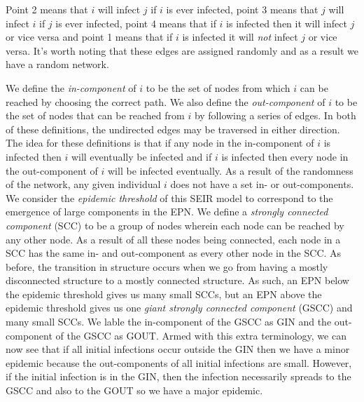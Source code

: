Point 2 means that $i$ will infect $j$ if $i$ is ever infected, point 3 means that $j$ will infect $i$ if $j$ is ever infected, point 4 means that if $i$ is infected then it will infect $j$ or vice
versa and point 1 means that if $i$ is infected it will \textit{not} infect $j$ or vice versa. It's worth noting that these edges are assigned randomly and as a result we have a
random network.

We define the \textit{in-component} of $i$ to be the set of nodes from which $i$ can be reached by choosing the correct path. We also define the \textit{out-component} of $i$ to be the set of nodes that can be reached from $i$
by following a series of edges. In both of these definitions, the undirected edges may be traversed in either direction. The idea for these definitions is that if any node in the
in-component of $i$ is infected then $i$ will eventually be infected and if $i$ is infected then every node in the out-component of $i$ will be infected eventually. As a result of
the randomness of the network, any given individual $i$ does not have a set in- or out-components. We consider the \textit{epidemic threshold} of this SEIR model to correspond to
the emergence of large components in the EPN. We define a \textit{strongly connected component} (SCC) to be a group of nodes wherein each node can be reached by any other node. As a
result of all these nodes being connected, each node in a SCC has the same in- and out-component as every other node in the SCC. As before, the transition in structure occurs when
we go from having a mostly disconnected structure to a mostly connected structure. As such, an EPN below the epidemic threshold gives us many small SCCs, but an EPN
above the epidemic threshold gives us one \textit{giant strongly connected component} (GSCC) and many small SCCs. We lable the in-component of the GSCC as GIN and the
out-component of the GSCC as GOUT. Armed with this extra terminology, we can now see that if all initial infections occur outside the GIN then we have a minor epidemic because the
out-components of all initial infections are small. However, if the initial infection is in the GIN, then the infection necessarily spreads to the GSCC and also to the GOUT so we
have a major epidemic.
